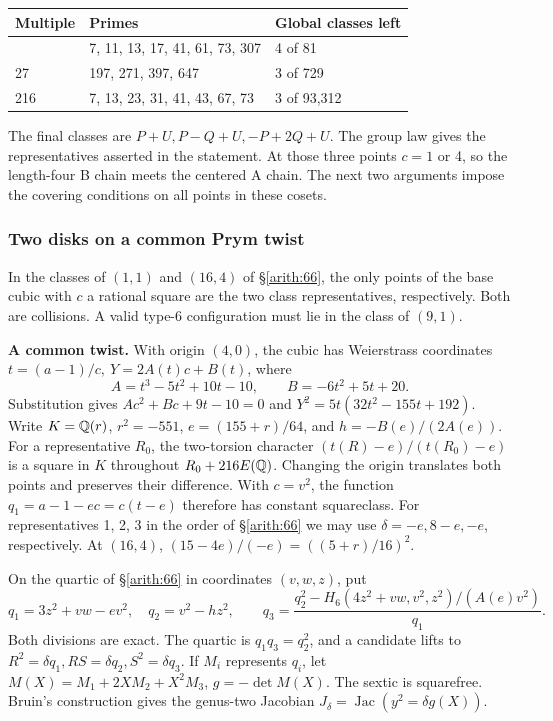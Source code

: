 {
\begin{longtable}[]{@{}lll@{}}
\toprule\noalign{}
Multiple & Primes & Global classes left \\
\midrule\noalign{}
\endhead
\bottomrule\noalign{}
\endlastfoot
9 & 7, 11, 13, 17, 41, 61, 73, 307 & 4 of 81 \\
27 & 197, 271, 397, 647 & 3 of 729 \\
216 & 7, 13, 23, 31, 41, 43, 67, 73 & 3 of 93,312 \\
\end{longtable}
}

The final classes are \(P+U,P-Q+U,-P+2Q+U\). The group law gives the
representatives asserted in the statement. At those three points
\(c=1\) or 4, so the length-four B chain meets the centered A chain.
The next two arguments impose the covering conditions on all points in these cosets.

\subsubsection{Two disks on a common Prym twist}\label{arith:67}

In the classes of \((1,1)\) and \((16,4)\) of
\S\ref{arith:66}, the only points of the base cubic with \(c\) a rational
square are the two class representatives, respectively. Both are
collisions. A valid type-6 configuration must lie in the class of
\((9,1)\).

\textbf{A common twist.} With origin \((4,0)\), the cubic has Weierstrass
coordinates \(t=(a-1)/c,\ Y=2A(t)c+B(t)\), where
\[A=t^3-5t^2+10t-10,\qquad B=-6t^2+5t+20.\]
Substitution gives \(Ac^2+Bc+9t-10=0\) and
\(Y^2=5t(32t^2-155t+192)\). Write \(K=\mathbb Q(r)\),
\(r^2=-551\), \(e=(155+r)/64\), and \(h=-B(e)/(2A(e))\).
For a representative \(R_0\), the two-torsion character
\((t(R)-e)/(t(R_0)-e)\) is a square in \(K\) throughout
\(R_0+216E(\mathbb Q)\). Changing the origin translates both points
and preserves their difference. With \(c=v^2\), the function
\(q_1=a-1-ec=c(t-e)\) therefore has constant squareclass.
For representatives 1, 2, 3 in the order of \S\ref{arith:66} we may use
\(\delta=-e,8-e,-e\), respectively. At \((16,4)\),
\((15-4e)/(-e)=((5+r)/16)^2\).

On the quartic of \S\ref{arith:66} in coordinates \((v,w,z)\), put
\[q_1=3z^2+vw-ev^2,\quad q_2=v^2-hz^2,\qquad
 q_3=\frac{q_2^2-H_6(4z^2+vw,v^2,z^2)/(A(e)v^2)}{q_1}.\]
Both divisions are exact. The quartic is \(q_1q_3=q_2^2\), and a
candidate lifts to \(R^2=\delta q_1, RS=\delta q_2,S^2=\delta q_3\).
If \(M_i\) represents \(q_i\), let
\(M(X)=M_1+2XM_2+X^2M_3\), \(g=-\det M(X)\). The sextic is
squarefree. Bruin's construction gives the genus-two Jacobian
\(J_\delta=\operatorname{Jac}(y^2=\delta g(X))\).
\cite[Theorem~5.1 and \S6]{BruinPrym}

